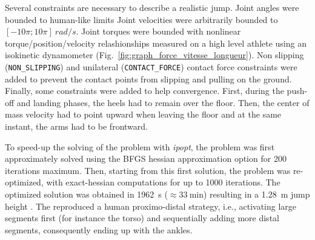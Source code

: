 
Several constraints are necessary to describe a realistic jump.
Joint angles were bounded to human-like limits
Joint velocities were arbitrarily bounded to $[-10 \pi; 10 \pi]~ rad/s$.
Joint torques were bounded with nonlinear torque/position/velocity relashionships measured on a high level athlete using an isokinetic dynamometer (Fig.~\ref{fig:graph_force_vitesse_longueur}). 
Non slipping (\texttt{NON\_SLIPPING}) and unilateral (\texttt{CONTACT\_FORCE}) contact force constraints were added to prevent the contact points from slipping and pulling on the ground.
Finally, some constraints were added to help convergence.
First, during the push-off and landing phases, the heels had to remain over the floor.
Then, the center of mass velocity had to point upward when leaving the floor and at the same instant, the arms had to be frontward. 

To speed-up the solving of the problem with \emph{ipopt}, the problem was first approximately solved using the BFGS hessian approximation option for 200 iterations maximum.
Then, starting from this first solution, the problem was re-optimized, with exact-hessian computations for up to 1000 iterations.
The optimized solution was obtained in \SI{1962}{\second} ($\approx\SI{33}{\minute}$) resulting in a \SI{1.28}{\meter} jump height .
The  reproduced a human proximo-distal strategy, i.e., activating large segments first (for instance the torso) and sequentially adding more distal segments, consequently ending up with the ankles.


